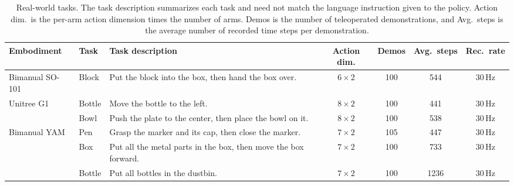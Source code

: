 \begin{table}[!ht]
    \centering
    \caption{Real-world tasks. The task description summarizes each task and
    need not match the language instruction given to the policy. Action dim.\
    is the per-arm action dimension times the number of arms. Demos is the
    number of teleoperated demonstrations, and Avg.\ steps is the average
    number of recorded time steps per demonstration.}
    \label{tab:real-world-task-details}
    \footnotesize
    \setlength{\tabcolsep}{4pt}
    \renewcommand{\arraystretch}{1.12}
    \begin{tabular}{@{}llp{}cccc@{}}
        \toprule
        Embodiment & Task & Task description & Action dim. & Demos & Avg.\ steps & Rec.\ rate \\
        \midrule
        Bimanual SO-101 & Block  & Put the block into the box, then hand the box over. & $6\times2$ & 100 & 544 & 30\,Hz \\
        \midrule
        Unitree G1 & Bottle & Move the bottle to the left. & $8\times2$ & 100 & 441 & 30\,Hz \\
                   & Bowl   & Push the plate to the center, then place the bowl on it. & $8\times2$ & 100 & 538 & 30\,Hz \\
        \midrule
        Bimanual YAM & Pen    & Grasp the marker and its cap, then close the marker. & $7\times2$ & 105 & 447 & 30\,Hz \\
                     & Box    & Put all the metal parts in the box, then move the box forward. & $7\times2$ & 100 & 733 & 30\,Hz \\
                     & Bottle & Put all bottles in the dustbin. & $7\times2$ & 100 & 1236 & 30\,Hz \\
        \bottomrule
    \end{tabular}
\end{table}
